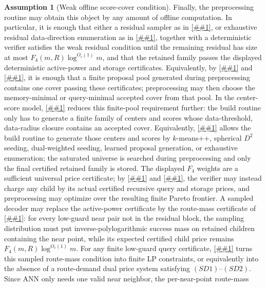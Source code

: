 \documentclass[10pt]{article}
\newcommand{\cref}[1]{\ref{##1}}
\theoremstyle{definition}
\newtheorem{assumption}[theorem]{Assumption}
\begin{document}
\begin{assumption}[Weak offline score-cover condition]
   Finally, the preprocessing routine may obtain this object by any amount of
   offline computation.  In particular, it is enough that either a residual
   sampler as in \cref{lem:weak-residual-cover}, or exhaustive residual
   data-direction enumeration as in \cref{lem:exhaustive-residual-cover},
   together with a deterministic verifier satisfies the weak residual condition
   until the remaining residual has size at most
   $F_4(m,R)\log^{O_c(1)}m$, and that the retained family passes the displayed
   deterministic active-power and storage certificates.  Equivalently, by
   \cref{lem:finite-pool-optimizer} and
   \cref{cor:offline-pareto-compression}, it is enough that a finite proposal
   pool generated during preprocessing contains one cover passing these
   certificates; preprocessing may then choose the memory-minimal or
   query-minimal accepted cover from that pool.  In the center-score model,
   \cref{cor:offline-center-score-saturation} reduces this finite-pool
   requirement further: the build routine only has to generate a finite family
   of centers and scores whose data-threshold, data-radius closure contains an
   accepted cover.  Equivalently, \cref{cor:seed-saturate-certify} allows the
   build routine to generate those centers and scores by $k$-means++,
   spherical \(D^2\) seeding, dual-weighted seeding, learned proposal
   generation, or exhaustive enumeration; the saturated universe is searched
   during preprocessing and only the final certified retained family is stored.
   The displayed $F_4$ weights are a sufficient universal
   price certificate; by \cref{lem:priced-cover-compiler} and
   \cref{cor:offline-recursive-pareto-pricing}, the verifier may instead charge
   any child by its actual certified recursive query and storage prices, and
   preprocessing may optimize over the resulting finite Pareto frontier.  A
   sampled decoder may replace the active-power certificate by the route-mass
   certificate of \cref{lem:sampled-priced-cover}: for every low-guard near
   pair not in the residual block, the sampling distribution must put
   inverse-polylogarithmic success mass on retained children containing the near
   point, while its expected certified child price remains
   $F_4(m,R)\log^{O_c(1)}m$.  For any finite low-guard query certificate,
   \cref{lem:finite-sampled-cover-dual} turns this sampled route-mass condition
   into finite LP constraints, or equivalently into the absence of a
   route-demand dual price system satisfying \((SD1)\)--\((SD2)\).
   Since ANN only needs one valid near neighbor, the per-near-point route-mass

\end{assumption}
\end{document}
